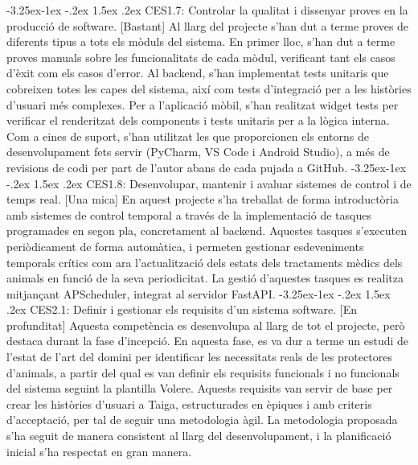 \documentclass[11pt,a4paper]{report}
\makeatletter
\renewcommand\paragraph{\@startsection{paragraph}{4}{\z@}%
    {-3.25ex\@plus -1ex \@minus -.2ex}%
    {1.5ex \@plus .2ex}
    {\normalfont\normalsize\bfseries}}
\makeatother
\begin{document}
\paragraph{CES1.7: Controlar la qualitat i dissenyar proves en la producció de software. [Bastant]}
Al llarg del projecte s'han dut a terme proves de diferents tipus a tots els mòduls del sistema. En primer lloc, s'han dut a terme proves manuals sobre les funcionalitats de cada mòdul, verificant tant els casos d'èxit com els casos d'error. Al backend, s'han implementat tests unitaris que cobreixen totes les capes del sistema, així com tests d'integració per a les històries d'usuari més complexes. Per a l'aplicació mòbil, s'han realitzat widget tests per verificar el renderitzat dels components i tests unitaris per a la lògica interna. Com a eines de suport, s'han utilitzat les que proporcionen els entorns de desenvolupament fets servir (PyCharm, VS Code i Android Studio), a més de revisions de codi per part de l'autor abans de cada pujada a GitHub.
\paragraph{CES1.8: Desenvolupar, mantenir i avaluar sistemes de control i de temps real. [Una mica]}
En aquest projecte s'ha treballat de forma introductòria amb sistemes de control temporal a través de la implementació de tasques programades en segon pla, concretament al backend. Aquestes tasques s'executen periòdicament de forma automàtica, i permeten gestionar esdeveniments temporals crítics com ara l'actualització dels estats dels tractaments mèdics dels animals en funció de la seva periodicitat. La gestió d'aquestes tasques es realitza mitjançant APScheduler, integrat al servidor FastAPI.
\paragraph{CES2.1: Definir i gestionar els requisits d'un sistema software. [En profunditat]}
Aquesta competència es desenvolupa al llarg de tot el projecte, però destaca durant la fase d'incepció. En aquesta fase, es va dur a terme un estudi de l'estat de l'art del domini per identificar les necessitats reals de les protectores d'animals, a partir del qual es van definir els requisits funcionals i no funcionals del sistema seguint la plantilla Volere. Aquests requisits van servir de base per crear les històries d'usuari a Taiga, estructurades en èpiques i amb criteris d'acceptació, per tal de seguir una metodologia àgil. La metodologia proposada s'ha seguit de manera consistent al llarg del desenvolupament, i la planificació inicial s'ha respectat en gran manera.
\end{document}
